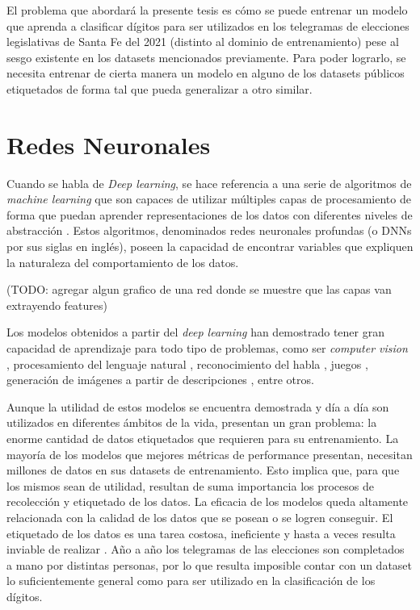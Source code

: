 El problema que abordar\'a la presente tesis es c\'omo se puede entrenar un modelo que aprenda a clasificar d\'igitos
para ser utilizados en los telegramas de elecciones legislativas de Santa Fe del 2021 (distinto al dominio de
entrenamiento) pese al sesgo existente en los datasets mencionados previamente. Para poder lograrlo, se necesita
entrenar de cierta manera un modelo en alguno de los datasets p\'ublicos etiquetados de forma tal que pueda generalizar
a otro similar.

\section{Redes Neuronales}

Cuando se habla de {\it Deep learning}, se hace referencia a una serie de algoritmos de {\it machine learning} que son
capaces de utilizar m\'ultiples capas de procesamiento de forma que puedan aprender representaciones de los datos con
diferentes niveles de abstracci\'on \parencite{lecun2015deep}. Estos algoritmos, denominados redes neuronales profundas (o DNNs por sus siglas en ingl\'es),
poseen la capacidad de encontrar variables que expliquen la naturaleza del comportamiento de los datos.

(TODO: agregar algun grafico de una red donde se muestre que las capas van extrayendo features)

Los modelos obtenidos a partir del {\it deep learning} han demostrado tener gran capacidad de aprendizaje para todo
tipo de problemas, como ser {\it computer vision} \parencite{szeliski2010computer, redmon2016yolo}, procesamiento del lenguaje natural \parencite{devlin2018bert}, reconocimiento del habla \parencite{hannun2014deep}, juegos \parencite{silver2016mastering}, generaci\'on de im\'agenes a partir de descripciones \parencite{ramesh2022dalle2}, entre otros.

Aunque la utilidad de estos modelos se encuentra demostrada y d\'ia a d\'ia son utilizados en diferentes \'ambitos de
la vida, presentan un gran problema: la enorme cantidad de datos etiquetados que requieren para su entrenamiento. La
mayor\'ia de los modelos que mejores m\'etricas de performance presentan, necesitan millones de datos en sus datasets
de entrenamiento. Esto implica que, para que los mismos sean de utilidad, resultan de suma importancia los procesos de
recolecci\'on y etiquetado de los datos. La eficacia de los modelos queda altamente relacionada con la calidad de los
datos que se posean o se logren conseguir. El etiquetado de los datos es una tarea costosa, ineficiente y hasta a veces
resulta inviable de realizar \parencite{reis2022data}. A\~{n}o a a\~{n}o los telegramas de las elecciones son completados a mano por distintas personas,
por lo que resulta imposible contar con un dataset lo suficientemente general como para ser utilizado en la
clasificaci\'on de los d\'igitos.

